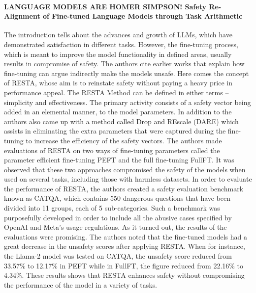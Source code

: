 \documentclass[conference]{IEEEtran}
\begin{document}
\paragraph{LANGUAGE MODELS ARE HOMER SIMPSON! Safety Re-Alignment of Fine-tuned Language Models through Task Arithmetic} The introduction tells about the advances and growth of LLMs, which have demonstrated satisfaction in different tasks. However, the fine-tuning process, which is meant to improve the model functionality in defined areas, usually results in compromise of safety. The authors cite earlier works that explain how fine-tuning can argue indirectly make the models unsafe. Here comes the concept of RESTA, whose aim is to reinstate safety without paying a heavy  price in performance appeal.
The RESTA Method can be defined in either terms – simplicity and effectiveness. The primary activity consists of a safety vector being added in an elemental manner, to the model parameters. In addition to the authors also came up with a method called Drop and REscale (DARE) which assists in eliminating the extra parameters that were captured during the fine-tuning to increase the efficiency of the safety vectors.
The authors made evaluations of RESTA on two ways of fine-tuning parameters called the parameter efficient fine-tuning PEFT and the full fine-tuning FullFT. It was observed that these two approaches compromised the safety of the models when used on several tasks, including those with harmless datasets. In order to evaluate the performance of RESTA, the authors created a safety evaluation benchmark known as CATQA, which contains 550 dangerous questions that have been divided into 11 groups, each of 5 sub-categories. Such a benchmark was purposefully developed in order to include all the abusive cases specified by OpenAI and Meta’s usage regulations.
As it turned out, the results of the evaluations were promising. The authors noted that the fine-tuned models had a great decrease in the unsafety scores after applying RESTA. When for instance, the Llama-2 model was tested on CATQA, the unsafety score reduced from 33.57\% to 12.17\% in PEFT while in FullFT, the figure reduced from 22.16\% to 4.34\%. These results shows that RESTA enhances safety without compromising the performance of the model in a variety of tasks.
\end{document}
